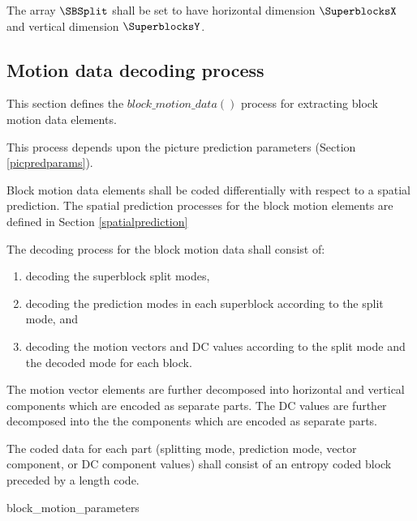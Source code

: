 The array $\SBSplit$ shall be set to have horizontal dimension $\SuperblocksX$ 
and vertical dimension $\SuperblocksY$.

\subsection{Motion data decoding process}
\label{decodingprocess}

This section defines the $block\_motion\_data()$ process for extracting
block motion data elements.

This process depends upon the picture prediction parameters (Section
 \ref{picpredparams}).

Block motion data elements shall be coded differentially with respect to a spatial
prediction.  The spatial prediction processes for the block motion elements are 
defined in Section \ref{spatialprediction}

The decoding process for the block motion data shall consist of: 
\begin{enumerate}
\item decoding the superblock split modes,
\item decoding the prediction modes in each superblock according to the split mode, and
\item decoding the motion vectors and DC values according to the split mode and the
 decoded mode for each block.
\end{enumerate}

The motion vector elements are further decomposed into horizontal and vertical 
components which are encoded as separate parts. The DC values are further
decomposed into the the components which are encoded as separate parts. 

The coded data for each part (splitting mode, prediction mode, vector component,
or DC component values) shall consist of an entropy coded block
 preceded by a length code. 

\begin{pseudo}{block\_motion\_parameters}{}
\bsEND
{}
\end{pseudo}

